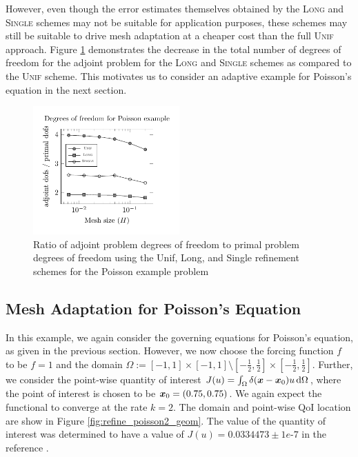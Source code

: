 However, even though the error estimates themselves obtained by
the \textsc{Long} and \textsc{Single} schemes may not be suitable
for application purposes, these schemes may still be suitable to
drive mesh adaptation at a cheaper cost than the full \textsc{Unif}
approach. Figure \ref{fig:refine_poisson_dofs}
demonstrates the decrease in the total number of degrees of
freedom for the adjoint problem for the \textsc{Long} and \textsc{Single}
schemes as compared to the \textsc{Unif} scheme. This motivates
us to consider an adaptive example for Poisson's equation in the
next section.

%
\begin{figure}[ht!]
\centering
\includegraphics[width=0.5\textwidth]{img/refine_poisson_dofs}
\caption{Ratio of adjoint problem degrees of freedom to primal
problem degrees of freedom using the Unif,
Long, and Single refinement schemes
for the Poisson example problem}
\label{fig:refine_poisson_dofs}
\end{figure}

\subsection{Mesh Adaptation for Poisson's Equation}

In this example, we again consider the governing equations for Poisson's
equation, as given in the previous section. However, we now choose the
forcing function $f$ to be $f=1$ and the domain
$\Omega := [-1,1] \times [-1,1] \setminus
[-\frac12, \frac12] \times [-\frac12, \frac12]$. Further, we consider
the point-wise quantity of interest
$J(u) = \int_{\Omega} \delta(\boldsymbol{x} - \boldsymbol{x}_0) u \, \text{d} \Omega$,
where the point of interest is chosen to be
$\boldsymbol{x}_0 = (0.75, 0.75)$. We again expect the functional to converge
at the rate $k = 2$. The domain and point-wise QoI location are show
in Figure \ref{fig:refine_poisson2_geom}. The value of the quantity
of interest was determined to have a value of $J(u) = 0.0334473
\pm 1e\mbox{-}7$ in the reference \cite{dealiistep14}.

